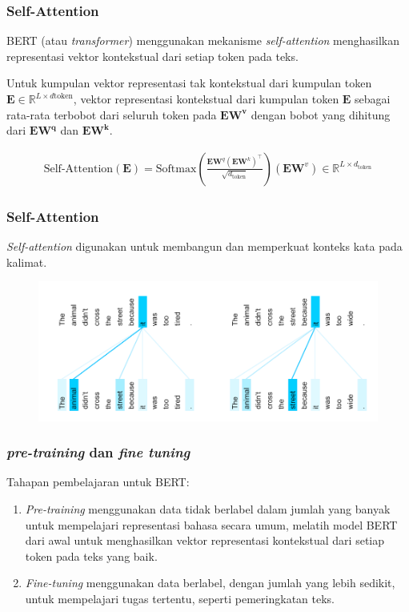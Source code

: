 \documentclass[10pt]{beamer}
\newcommand{\f}[1]{\textit{#1}}
\begin{document}
\begin{frame}
    \frametitle{Self-Attention}
    BERT (atau \f{transformer}) menggunakan mekanisme \f{self-attention} menghasilkan representasi vektor kontekstual dari setiap token pada teks.

    Untuk kumpulan vektor representasi tak kontekstual dari kumpulan token $\mathbf{E}\in \mathbb{R}^{L \times d{{\text{token}}}}$, vektor representasi kontekstual dari kumpulan token $\mathbf{E}$ sebagai rata-rata terbobot dari seluruh token pada $\mathbf{EW^v}$ dengan bobot yang dihitung dari $\mathbf{EW^q}$ dan $\mathbf{EW^k}$.
    
\begin{align*}
    \text{Self-Attention}(\mathbf{E})  = \text{Softmax}(\frac{\mathbf{E} \mathbf{W}^q (\mathbf{E} \mathbf{W}^k)^{\top}}{\sqrt{d_{\text{token}}}}) (\mathbf{E} \mathbf{W}^v) \in \mathbb{R}^{L \times d_{\text{token}}}
\end{align*}

\end{frame}

\begin{frame}
    \frametitle{Self-Attention}
    \f{Self-attention} digunakan untuk membangun dan memperkuat konteks kata pada kalimat.

    \begin{figure}[!ht]
		\centering
		\includegraphics[width=1\textwidth]{assets/pics/self-attn-example.png}
		\label{fig:self-attention-example}
	\end{figure}

\end{frame}

\begin{frame}
    \frametitle{\f{pre-training} dan \f{fine tuning}}

Tahapan pembelajaran untuk BERT:
\begin{enumerate}
    \item \f{Pre-training} menggunakan data tidak berlabel dalam jumlah yang banyak untuk mempelajari representasi bahasa secara umum, melatih model BERT dari awal untuk menghasilkan vektor representasi kontekstual dari setiap token pada teks yang baik.
    \item \f{Fine-tuning} menggunakan data berlabel, dengan jumlah yang lebih sedikit, untuk mempelajari tugas tertentu, seperti pemeringkatan teks.
\end{enumerate}
\end{frame}
\end{document}
